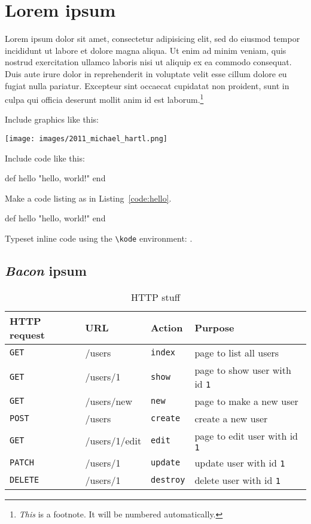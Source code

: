 \chapter{Lorem ipsum}
\label{cha:lorem_ipsum}

Lorem ipsum dolor sit amet, consectetur adipisicing elit, sed do eiusmod
tempor incididunt ut labore et dolore magna aliqua. Ut enim ad minim veniam,
quis nostrud exercitation ullamco laboris nisi ut aliquip ex ea commodo
consequat. Duis aute irure dolor in reprehenderit in voluptate velit esse
cillum dolore eu fugiat nulla pariatur. Excepteur sint occaecat cupidatat non
proident, sunt in culpa qui officia deserunt mollit anim id est laborum.\footnote{\emph{This} is a footnote. It will be numbered automatically.}

Include graphics like this:

\texttt{[image: images/2011\_michael\_hartl.png]}


Include code like this:

\begin{code}
def hello
  "hello, world!"
end
\end{code}

Make a code listing as in Listing~\ref{code:hello}.

\begin{codelisting}
\label{code:hello}
\begin{code}
def hello
  "hello, world!"
end
\end{code}
\end{codelisting}

Typeset inline code using the \verb+\kode+ environment: .

\section{\emph{Bacon} ipsum}
\label{sec:bacon_ipsum}

\begin{table}
\begin{tabular}{llll}
\textbf{HTTP request} & \textbf{URL} & \textbf{Action} & \textbf{Purpose} \\ \hline

\texttt{GET} & /users & \texttt{index} & page to list all users \\
\texttt{GET} & /users/1 & \texttt{show} & page to show user with id \texttt{1}\\
\texttt{GET} & /users/new & \texttt{new} & page to make a new user \\
\texttt{POST} & /users & \texttt{create} & create a new user \\
\texttt{GET} & /users/1/edit & \texttt{edit} & page to edit user with id \texttt{1} \\
\texttt{PATCH} & /users/1 & \texttt{update} & update user with id \texttt{1}  \\
\texttt{DELETE} & /users/1 & \texttt{destroy} & delete user with id \texttt{1}
\end{tabular}
\caption{HTTP stuff\label{table:foo}}
\end{table}


